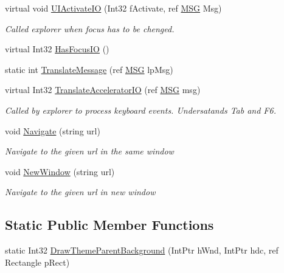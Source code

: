 \begin{DoxyCompactItemize}
\item 
virtual void \hyperlink{class_band_objects_lib_1_1_band_object_a9056d2a8271873b5d6cea8331144f3cb}{U\+I\+Activate\+I\+O} (Int32 f\+Activate, ref \hyperlink{struct_band_objects_lib_1_1_m_s_g}{M\+S\+G} Msg)
\begin{DoxyCompactList}\small\item\em Called explorer when focus has to be chenged. \end{DoxyCompactList}\item 
virtual Int32 \hyperlink{class_band_objects_lib_1_1_band_object_ac4eb8af81680edfae92751aad91c96ab}{Has\+Focus\+I\+O} ()
\item 
static int \hyperlink{class_band_objects_lib_1_1_band_object_ae74d470d5e8ac92786be3a5cd577a90a}{Translate\+Message} (ref \hyperlink{struct_band_objects_lib_1_1_m_s_g}{M\+S\+G} lp\+Msg)
\item 
virtual Int32 \hyperlink{class_band_objects_lib_1_1_band_object_a64696472b11d10aa753a5f447012c3a8}{Translate\+Accelerator\+I\+O} (ref \hyperlink{struct_band_objects_lib_1_1_m_s_g}{M\+S\+G} msg)
\begin{DoxyCompactList}\small\item\em Called by explorer to process keyboard events. Undersatands Tab and F6. \end{DoxyCompactList}\item 
void \hyperlink{class_band_objects_lib_1_1_band_object_ad6aaf3f684f64ebfe56b0d9a2cd3812b}{Navigate} (string url)
\begin{DoxyCompactList}\small\item\em Navigate to the given url in the same window \end{DoxyCompactList}\item 
void \hyperlink{class_band_objects_lib_1_1_band_object_a2446350d39d038ba6eb4b88d09c9b9b0}{New\+Window} (string url)
\begin{DoxyCompactList}\small\item\em Navigate to the given url in new window \end{DoxyCompactList}\end{DoxyCompactItemize}
\subsection*{Static Public Member Functions}
\begin{DoxyCompactItemize}
\item 
static Int32 \hyperlink{class_band_objects_lib_1_1_band_object_ad1c361f8bacd1714c2f07d49371ae1bc}{Draw\+Theme\+Parent\+Background} (Int\+Ptr h\+Wnd, Int\+Ptr hdc, ref Rectangle p\+Rect)
\end{DoxyCompactItemize}
